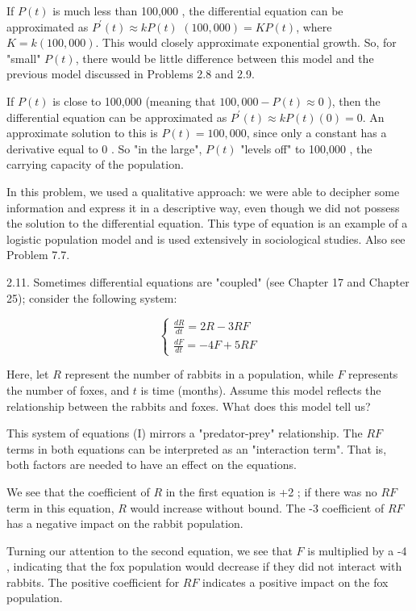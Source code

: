 \documentclass[10pt]{article}
\begin{document}
If $P(t)$ is much less than 100,000 , the differential equation can be approximated as $P^{\prime}(t) \approx k P(t)$ $(100,000)=K P(t)$, where $K=k(100,000)$. This would closely approximate exponential growth. So, for "small" $P(t)$, there would be little difference between this model and the previous model discussed in Problems 2.8 and 2.9.

If $P(t)$ is close to 100,000 (meaning that $100,000-P(t) \approx 0$ ), then the differential equation can be approximated as $P^{\prime}(t) \approx k P(t)(0)=0$. An approximate solution to this is $P(t)=100,000$, since only a constant has a derivative equal to 0 . So "in the large", $P(t)$ "levels off" to 100,000 , the carrying capacity of the population.

In this problem, we used a qualitative approach: we were able to decipher some information and express it in a descriptive way, even though we did not possess the solution to the differential equation. This type of equation is an example of a logistic population model and is used extensively in sociological studies. Also see Problem 7.7.

2.11. Sometimes differential equations are "coupled" (see Chapter 17 and Chapter 25); consider the following system:

\[
\left\{\begin{array}{l}
\frac{d R}{d t}=2 R-3 R F  \tag{1}\\
\frac{d F}{d t}=-4 F+5 R F
\end{array}\right.
\]

Here, let $R$ represent the number of rabbits in a population, while $F$ represents the number of foxes, and $t$ is time (months). Assume this model reflects the relationship between the rabbits and foxes. What does this model tell us?

This system of equations (I) mirrors a "predator-prey" relationship. The $R F$ terms in both equations can be interpreted as an "interaction term". That is, both factors are needed to have an effect on the equations.

We see that the coefficient of $R$ in the first equation is +2 ; if there was no $R F$ term in this equation, $R$ would increase without bound. The -3 coefficient of $R F$ has a negative impact on the rabbit population.

Turning our attention to the second equation, we see that $F$ is multiplied by a -4 , indicating that the fox population would decrease if they did not interact with rabbits. The positive coefficient for $R F$ indicates a positive impact on the fox population.
\end{document}

